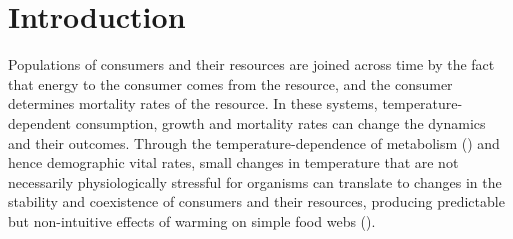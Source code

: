 \documentclass[11pt]{article}
\begin{document}
\newpage{}

\section*{Introduction}




%
%


Populations of consumers and their resources are joined across time by the fact that energy to the consumer comes from the resource, and the consumer determines mortality rates of the resource. 
In these systems, temperature-dependent consumption, growth and mortality rates can change the dynamics and their outcomes. 
Through the temperature-dependence of metabolism (\cite{West1997,Gillooly2001}) and hence demographic vital rates, small changes in temperature that are not necessarily physiologically stressful for organisms can translate to changes in the stability and coexistence of consumers and their resources, producing predictable but non-intuitive effects of warming on simple food webs (\cite{Gilbert2014,Vasseur2005,OConnor2011,Rall2010}). 
\end{document}
